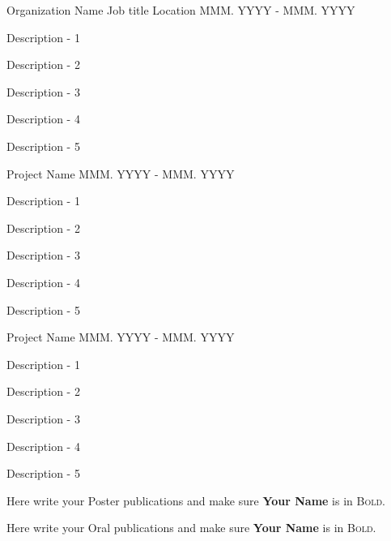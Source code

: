 \documentclass[11pt, a4paper]{resume-lab}
\begin{document}
\begin{Parallel}{0.25\textwidth}{0.65\textwidth}
{\begin{cvletter}
\cventry
    {Organization Name} %
    {Job title} %
    {Location} %
    {MMM. YYYY - MMM. YYYY} %
    {
      \begin{cvitems} %
        \item {Description - 1}
        \item {Description - 2}
        \item {Description - 3}
        \item {Description - 4}
        \item {Description - 5}
      \end{cvitems}
    }
\cvhonor
    {Project Name} %
    {MMM. YYYY - MMM. YYYY} %
    {
      \begin{cvitems} %
        \item {Description - 1}
        \item {Description - 2}
        \item {Description - 3}
        \item {Description - 4}
        \item {Description - 5}
      \end{cvitems}
    }

\cvhonor
    {Project Name} %
    {MMM. YYYY - MMM. YYYY} %
    {
      \begin{cvitems} %
        \item {Description - 1}
        \item {Description - 2}
        \item {Description - 3}
        \item {Description - 4}
        \item {Description - 5}
      \end{cvitems}
    }
Here write your Poster publications and make sure \textbf{Your Name} is in \textsc{Bold}.

Here write your Oral publications and make sure \textbf{Your Name} is in \textsc{Bold}.


\end{cvletter}
}
\ParallelPar
\end{Parallel}
\end{document}
